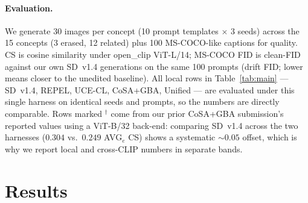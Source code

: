 \documentclass[10pt,twocolumn,letterpaper]{article}
\begin{document}
\paragraph{Evaluation.} We generate $30$ images per concept
(10 prompt templates $\times$ 3 seeds) across the 15 concepts (3 erased,
12 related) plus 100 MS-COCO-like captions for quality. CS is cosine
similarity under open\_clip ViT-L/14; MS-COCO FID is clean-FID against
our own SD~v1.4 generations on the same 100 prompts (drift FID; lower
means closer to the unedited baseline). All local rows in
Table~\ref{tab:main} --- SD~v1.4, REPEL, UCE-CL, CoSA+GBA, Unified ---
are evaluated under this single harness on identical seeds and prompts,
so the numbers are directly comparable. Rows marked $^\dagger$ come from
our prior CoSA+GBA submission's reported values using a ViT-B/32
back-end: comparing SD~v1.4 across the two harnesses ($0.304$ vs.\
$0.249$ AVG$_e$ CS) shows a systematic $\sim\!0.05$ offset, which is why
we report local and cross-CLIP numbers in separate bands.

\section{Results}
\label{sec:results}
\end{document}
